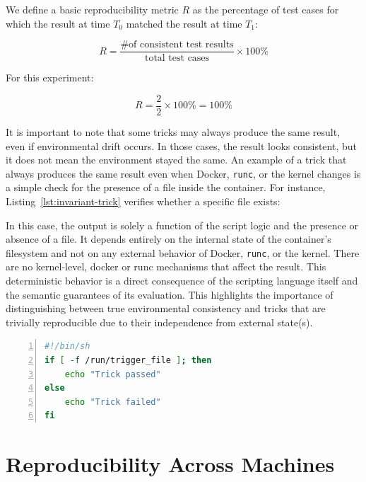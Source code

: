 \documentclass[12pt]{report}
\begin{document}
\begin{doublespace}
We define a basic reproducibility metric \( R \) as the percentage of test cases for which the result at time \( T_0 \) matched the result at time \( T_1 \):

\[
R = \frac{\text{\# of consistent test results}}{\text{total test cases}} \times 100\%
\]

For this experiment:

\[
R = \frac{2}{2} \times 100\% = 100\%
\]

It is important to note that some tricks may always produce the same result, even if environmental drift occurs. In those cases, the result looks consistent, but it does not mean the environment stayed the same. An example of a trick that always produces the same result even when Docker, \texttt{runc}, or the kernel changes is a simple check for the presence of a file inside the container. For instance, Listing~\ref{lst:invariant-trick} verifies whether a specific file exists:

In this case, the output is solely a function of the script logic and the presence or absence of a file. It depends entirely on the internal state of the container's filesystem and not on any external behavior of Docker, \texttt{runc}, or the kernel. There are no kernel-level, docker or runc mechanisms that affect the result. This deterministic behavior is a direct consequence of the scripting language itself and the semantic guarantees of its evaluation. This highlights the importance of distinguishing between true environmental consistency and tricks that are trivially reproducible due to their independence from external state(s).

\begin{lstlisting}[language=bash, caption={Trick that is invariant to environment changes}, label={lst:invariant-trick}, numbers=left, numberstyle=\tiny, stepnumber=1, frame=single, backgroundcolor=\color{gray!10}, basicstyle=\ttfamily\footnotesize,  showspaces=false, showstringspaces=false]
#!/bin/sh
if [ -f /run/trigger_file ]; then
    echo "Trick passed"
else
    echo "Trick failed"
fi
\end{lstlisting}



















\section{Reproducibility Across Machines}


\end{doublespace}
\end{document}
